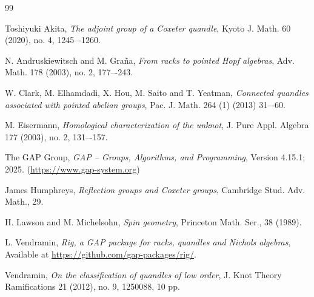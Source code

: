 \documentclass{amsart}
\theoremstyle{definition}
\theoremstyle{remark}
\numberwithin{equation}{section}
\begin{document}
\begin{thebibliography}{99}

Toshiyuki Akita,
\textit{The adjoint group of a Coxeter quandle}, 
Kyoto J. Math. 60 (2020), no. 4, 1245–-1260.

N. Andruskiewitsch and M. Gra\~{n}a, 
\textit{From racks to pointed Hopf algebras}, 
Adv. Math. 178 (2003), no. 2, 177–-243.

W. Clark, M. Elhamdadi, X. Hou, M. Saito and T. Yeatman, 
\textit{Connected quandles associated with pointed abelian groups}, 
Pac. J. Math. 264 (1) (2013) 31–-60.

M. Eisermann,
\textit{Homological characterization of the unknot},
J. Pure Appl. Algebra 177 (2003), no. 2, 131–-157.

The GAP Group, \textit{GAP -- Groups, Algorithms, and Programming}, 
Version 4.15.1; 2025. (\url{https://www.gap-system.org})


James Humphreys,
\textit{Reflection groups and Coxeter groups}, 
Cambridge Stud. Adv. Math., 29.


H. Lawson and M. Michelsohn, 
\textit{Spin geometry}, Princeton Math. Ser., 38 (1989).

L. Vendramin,
\textit{Rig, a GAP package for racks, quandles and Nichols algebras}, 
Available at \url{https://github.com/gap-packages/rig/}.

Vendramin, 
\textit{On the classification of quandles of low order},
J. Knot Theory Ramifications 21 (2012), no. 9, 1250088, 10 pp.

\end{thebibliography}
\end{document}
